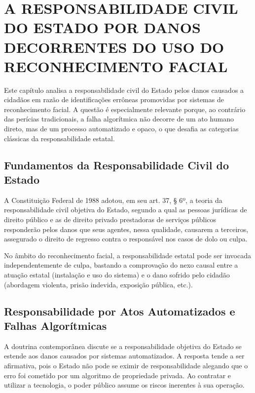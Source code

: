 \documentclass[12pt,a4paper]{article}
\begin{document}
\section{A RESPONSABILIDADE CIVIL DO ESTADO POR DANOS DECORRENTES DO USO DO RECONHECIMENTO FACIAL}

Este capítulo analisa a responsabilidade civil do Estado pelos danos causados a cidadãos em razão de identificações errôneas promovidas por sistemas de reconhecimento facial. A questão é especialmente relevante porque, ao contrário das perícias tradicionais, a falha algorítmica não decorre de um ato humano direto, mas de um processo automatizado e opaco, o que desafia as categorias clássicas da responsabilidade estatal.

\subsection{Fundamentos da Responsabilidade Civil do Estado}

A Constituição Federal de 1988 adotou, em seu art. 37, § 6º, a teoria da responsabilidade civil objetiva do Estado, segundo a qual as pessoas jurídicas de direito público e as de direito privado prestadoras de serviços públicos responderão pelos danos que seus agentes, nessa qualidade, causarem a terceiros, assegurado o direito de regresso contra o responsável nos casos de dolo ou culpa.

No âmbito do reconhecimento facial, a responsabilidade estatal pode ser invocada independentemente de culpa, bastando a comprovação do nexo causal entre a atuação estatal (instalação e uso do sistema) e o dano sofrido pelo cidadão (abordagem violenta, prisão indevida, exposição pública, etc.).

\subsection{Responsabilidade por Atos Automatizados e Falhas Algorítmicas}

A doutrina contemporânea discute se a responsabilidade objetiva do Estado se estende aos danos causados por sistemas automatizados. A resposta tende a ser afirmativa, pois o Estado não pode se eximir de responsabilidade alegando que o erro foi cometido por um algoritmo de propriedade privada. Ao contratar e utilizar a tecnologia, o poder público assume os riscos inerentes à sua operação.
\end{document}
